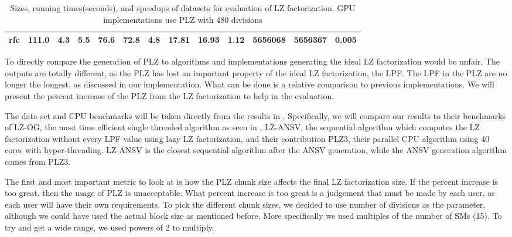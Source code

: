 \begin{table}
\begin{tabular}{@{}|l|l|l|l|l|l|l|l|l|l|l|l|l|@{}}
rfc          & 111.0                                                   & 4.3   & 5.5  & 76.6  & 72.8    & 4.8  & 17.81                                                           & 16.93                                                             & 1.12                                                           & 5656068 & 5656367 & 0.005                                                      \\ \bottomrule
\end{tabular}
\caption{Sizes, running times(seconds), and speedups of datasets for evaluation of LZ factorization. GPU implementations use PLZ with 480 divisions}
\label{tab:lzdata}
\end{table}

To directly compare the generation of PLZ to algorithms and implementations generating the ideal LZ factorization would be unfair.
The outputs are totally different, as the PLZ has lost an important property of the ideal LZ factorization, the LPF.
The LPF in the PLZ are no longer the longest, as discussed in our implementation.
What can be done is a relative comparison to previous implementations.
We will present the percent increase of the PLZ from the LZ factorization to help in the evaluation.

The data set and CPU benchmarks will be taken directly from the results in \cite{shun2013practical}. 
Specifically, we will compare our results to their benchmarks of LZ-OG, the most time efficient single threaded algorithm as seen in \cite{ohlebusch2011lempel}, LZ-ANSV, the sequential algorithm which computes the LZ factorization without every LPF value using lazy LZ factorization, and their contribution PLZ3, their parallel CPU algorithm using 40 cores with hyper-threading.
LZ-ANSV is the closest sequential algorithm after the ANSV generation, while the ANSV generation algorithm comes from PLZ3.

The first and most important metric to look at is how the PLZ chunk size affects the final LZ factorization size.
If the percent increase is too great, then the usage of PLZ is unacceptable.
What percent increase is too great is a judgement that must be made by each user, as each user will have their own requirements.
To pick the different chunk sizes, we decided to use number of divisions as the parameter, although we could have used the actual block size as mentioned before.
More specifically we used multiples of the number of SMs (15).
To try and get a wide range, we used powers of 2 to multiply.

